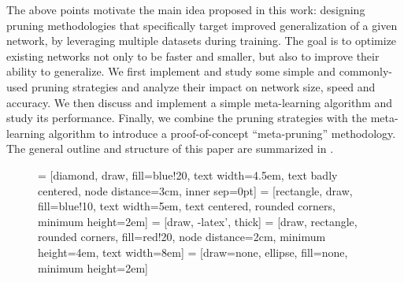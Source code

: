 \documentclass{article}
\begin{document}
The above points motivate the main idea proposed in this work: designing pruning methodologies that specifically target improved generalization of a given network, by leveraging multiple datasets during training. The goal is to optimize existing networks not only to be faster and smaller, but also to improve their ability to generalize. We first implement and study some simple and commonly-used pruning strategies and analyze their impact on network size, speed and accuracy. We then discuss and implement a simple meta-learning algorithm and study its performance. Finally, we combine the pruning strategies with the meta-learning algorithm to introduce a proof-of-concept ``meta-pruning'' methodology. The general outline and structure of this paper are summarized in .

\begin{figure}[t]
	\centering
	
	 = [diamond, draw, fill=blue!20, 
	text width=4.5em, text badly centered, node distance=3cm, inner sep=0pt]
	 = [rectangle, draw, fill=blue!10, 
	text width=5em, text centered, rounded corners, minimum height=2em]
	 = [draw, -latex', thick]
	 = [draw, rectangle, rounded corners, fill=red!20, node distance=2cm,
	minimum height=4em, text width=8em]
	 = [draw=none, ellipse, fill=none,
	minimum height=2em]
	

\end{figure}
\end{document}
